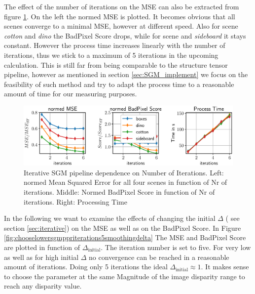 \documentclass  [
  paper    = a4,
  BCOR     = 10mm,
  twoside,
  fontsize = 12pt,
  fleqn,
  toc      = bibnumbered,
  toc      = listofnumbered,
  numbers  = noendperiod,
  headings = normal,
  listof   = leveldown,
  version  = 3.03
]                                       {scrreprt}
\begin{document}
The effect of the number of iterations on the MSE can also be extracted from figure \ref{fig:chooselowersgmpprmergeiterations}. On the left the normed MSE is plotted. It becomes obvious that all scenes converge to a minimal MSE, however at different speed. Also for scene \textit{cotton} and \textit{dino} the BadPixel Score drops, while for scene  and \textit{sideboard} it stays constant. However the process time increases linearly with the number of iterations, thus we stick to a maximum of 5 iterations in the upcoming calculation. This is still far from being comparable to the structure tensor pipeline, however as mentioned in section \ref{sec:SGM_implement} we focus on the feasibility of such method and try to adapt the process time to a reasonable amount of time for our measuring purposes.
\begin{figure}
	\centering
	\includegraphics[width=1\linewidth]{images/choose_lower_sgm_ppr_merge_iterations}
	\caption[Iterative SGM dependence on Number of Iterations]{Iterative SGM pipeline dependence on Number of Iterations. Left: normed Mean Squared Error for all four scenes in function  of Nr of iterations. Middle: Normed BadPixel Score in function of Nr of iterations. Right: Processing Time}
	\label{fig:chooselowersgmpprmergeiterations}
\end{figure}

In the following we want to examine the effects of changing the initial $\Delta$ ( see section \ref{sec:iterative}) on the MSE as well as on the BadPixel Score. In Figure \ref{fig:chooselowersgmppriterations5smoothingdelta} The MSE and BadPixel Score are plotted in function of $\Delta_\text{initial}$. The iteration number is set to five. For very low as well as for high initial $\Delta$ no convergence can be reached in a reasonable amount of iterations. Doing only 5 iterations the ideal $\Delta_\text{initial} \approx 1$. It makes sense to choose the parameter at the same Magnitude of the image disparity range to reach any disparity value.
\end{document}
